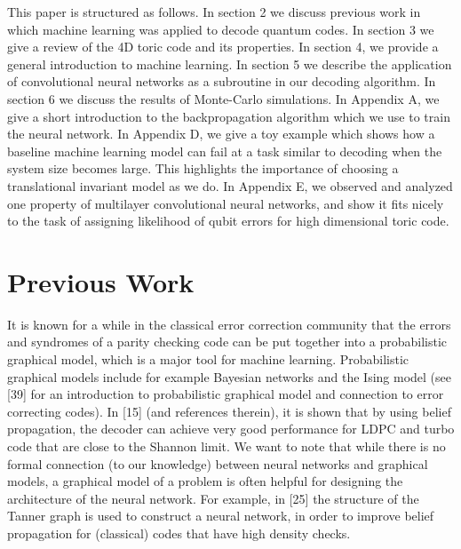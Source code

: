 \documentclass[]{compositionalityarticle}
\begin{document}
This paper is structured as follows. In section 2 we discuss previous work in which machine learning was applied to decode quantum codes. In section 3 we give a review of the 4D
toric code and its properties. In section 4, we provide a general introduction to machine learning. In section 5 we describe the application of convolutional neural networks as a subroutine in our decoding algorithm. In section 6 we discuss the results of Monte-Carlo simulations. In Appendix A, we give a short introduction to the backpropagation algorithm which we use to train the neural network. In Appendix D, we give a toy example which shows how a baseline machine learning model can fail at a
task similar to decoding when the system size becomes large. This highlights the importance of choosing a translational invariant model as we do. In Appendix E, we observed and analyzed one property of multilayer convolutional neural networks, and show it fits nicely to the task of assigning likelihood of qubit errors for high dimensional toric code.

\section{Previous Work}

It is known for a while in the classical error correction community that the errors and syndromes of a parity checking code can be put together into a probabilistic graphical model, which is a major tool for machine learning. Probabilistic graphical models include for example Bayesian networks and the Ising model (see [39] for an introduction to probabilistic graphical model and connection to error correcting codes). In [15] (and references therein), it is shown that by using belief propagation, the decoder can achieve very good performance for LDPC and turbo code that are close to the Shannon limit. We want to note that while there is no formal connection (to our knowledge) between neural networks and graphical models, a graphical model of a problem is often helpful for designing the architecture of the neural network. For example, in [25] the structure of the Tanner graph is used to construct a neural network, in order to improve belief propagation for (classical) codes that have high density checks.
\end{document}

